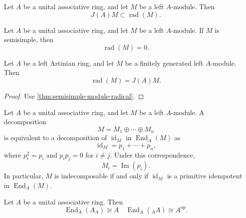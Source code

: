 \begin{corollary}
\label{cor:jacobson-radical-contained-in-module-radical}
Let \(A\) be a unital associative ring, and let \(M\) be a left \(A\)-module.
Then
\[
J(A)M\subset \operatorname{rad}(M).
\]
\end{corollary}

\begin{theorem} \label{thm:semisimple-module-radical} 
    Let \(A\) be a unital associative ring, and let \(M\) be a left \(A\)-module. If \(M\) is semisimple, then \[ \operatorname{rad}(M)=0. \] 
\end{theorem}


\begin{theorem}
\label{thm:module-radical-artinian}
Let \(A\) be a left Artinian ring, and let \(M\) be a finitely generated left
\(A\)-module. Then
\[
\operatorname{rad}(M)=J(A)M.
\]
\end{theorem}

\begin{proof}
    Use \autoref{thm:semisimple-module-radical}.
\end{proof}



\begin{theorem}
\label{thm:direct-sum-and-idempotents}
Let \(A\) be a unital associative ring, and let \(M\) be a left
\(A\)-module. A decomposition
\[
M=M_1\oplus\cdots\oplus M_n
\]
is equivalent to a decomposition of \(\operatorname{id}_M\) in
\(\operatorname{End}_A(M)\) as
\[
\operatorname{id}_M=p_1+\cdots+p_n,
\]
where \(p_i^2=p_i\) and \(p_ip_j=0\) for \(i\neq j\). Under this
correspondence,
\[
M_i=\operatorname{Im}(p_i).
\]
In particular, \(M\) is indecomposable if and only if \(\operatorname{id}_M\)
is a primitive idempotent in \(\operatorname{End}_A(M)\).
\end{theorem}


\begin{theorem}
\label{thm:endomorphism-ring-of-regular-module}
Let \(A\) be a unital associative ring. Then
\[
\operatorname{End}_A(A_A)\cong A \quad \operatorname{End}_A(_A A)\cong A^{\text{op}}.
\]
\end{theorem}



